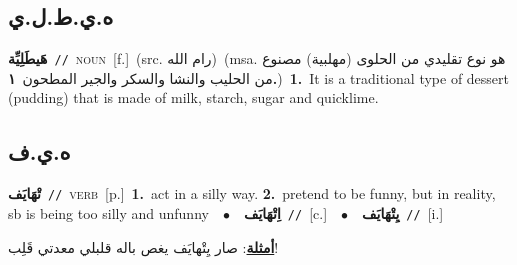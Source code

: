 \documentclass[10pt,a4paper,twoside]{article} %
\begin{document}
\begin{multicols}{2}
\vspace{-3mm}
\subsection*{\color{blue}\foreignlanguage{arabic}{ه.ي.ط.ل.ي}\color{blue}{ (ntws)}} 

{\setlength\topsep{0pt}\textbf{\foreignlanguage{arabic}{هَيطَلِيِّة}}\ {\color{gray}\texttt{//}\color{black}}\ \textsc{noun}\ [f.]\ (src. \color{gray}\foreignlanguage{arabic}{رام الله}\color{black})\ \color{gray}(msa. \foreignlanguage{arabic}{هو نوع تقليدي من الحلوى (مهلبية) مصنوع من الحليب والنشا والسكر والجير المطحون}~\foreignlanguage{arabic}{\textbf{١.}})\color{black}\ \textbf{1.}~It is a traditional type of dessert (pudding) that is made of milk, starch, sugar  and quicklime.\ } \vspace{2mm}

\vspace{-3mm}
\subsection*{\color{blue}\foreignlanguage{arabic}{ه.ي.ف}\color{blue}{}} 

{\setlength\topsep{0pt}\textbf{\foreignlanguage{arabic}{تْهَايَف}}\ {\color{gray}\texttt{//}\color{black}}\ \textsc{verb}\ [p.]\ \textbf{1.}~act in a silly way.  \textbf{2.}~pretend to be funny, but in reality, sb is being too silly and unfunny\ \ $\bullet$\ \ \setlength\topsep{0pt}\textbf{\foreignlanguage{arabic}{اِتْهَايَف}}\ {\color{gray}\texttt{//}\color{black}}\ [c.]\ \ $\bullet$\ \ \setlength\topsep{0pt}\textbf{\foreignlanguage{arabic}{يِتْهَايَف}}\ {\color{gray}\texttt{//}\color{black}}\ [i.]\  \begin{flushright}\color{gray}\foreignlanguage{arabic}{\textbf{\underline{\foreignlanguage{arabic}{أمثلة}}}: صار يِتْهايَف يغص باله قلبلي معدتي قَلِب!}\end{flushright}\color{black}} \vspace{2mm}


\end{multicols}
\end{document}
